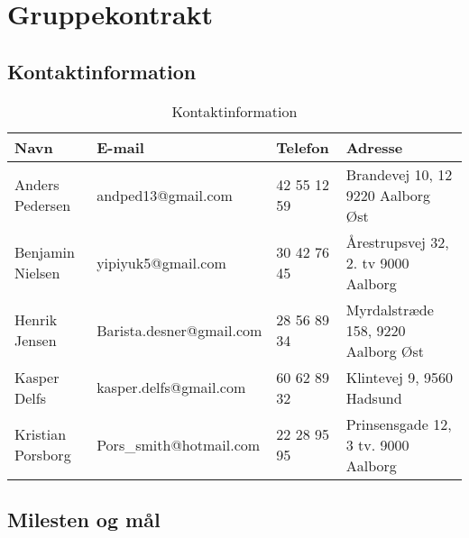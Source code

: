 \section{Gruppekontrakt}
\subsection{Kontaktinformation}
\begin{table}[h]
\centering

\begin{tabular}{|l|l|l|p{4cm}|}
\hline
\rowcolor{lightgray}
Navn			  & E-mail					 & Telefon     & Adresse 							 \\ \hline
Anders Pedersen   & andped13@gmail.com       & 42 55 12 59 & Brandevej 10, 12 9220 Aalborg Øst    \\ \hline
Benjamin Nielsen  & yipiyuk5@gmail.com       & 30 42 76 45 & Årestrupsvej 32, 2. tv 9000 Aalborg \\ \hline
Henrik Jensen     & Barista.desner@gmail.com & 28 56 89 34 & Myrdalstræde 158, 9220 Aalborg Øst  \\ \hline
Kasper Delfs      & kasper.delfs@gmail.com   & 60 62 89 32 & Klintevej 9, 9560 Hadsund           \\ \hline
Kristian Porsborg & Pors\_smith@hotmail.com  & 22 28 95 95 & Prinsensgade 12, 3 tv. 9000 Aalborg \\ \hline
\end{tabular}
\caption{Kontaktinformation}
\label{kontaktinformation}
\end{table}

\subsection{Milesten og mål}

